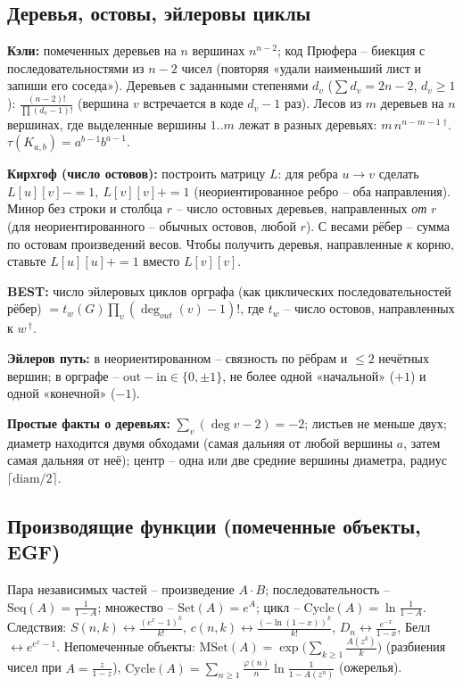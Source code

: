 \subsection{Деревья, остовы, эйлеровы циклы}
\textbf{Кэли:} помеченных деревьев на $n$ вершинах $n^{n-2}$; код Прюфера -- биекция с последовательностями из $n{-}2$ чисел (повторяя «удали наименьший лист и запиши его соседа»). Деревьев с заданными степенями $d_v$ ($\sum d_v=2n{-}2$, $d_v\ge1$): $\frac{(n-2)!}{\prod(d_v-1)!}$ (вершина $v$ встречается в коде $d_v{-}1$ раз). Лесов из $m$ деревьев на $n$ вершинах, где выделенные вершины $1..m$ лежат в разных деревьях: $m\,n^{n-m-1}$\,$^\dagger$. $\tau(K_{a,b})=a^{b-1}b^{a-1}$.
\par \textbf{Кирхгоф (число остовов):} построить матрицу $L$: для ребра $u\to v$ сделать $L[u][v]{-}{=}1,\ L[v][v]{+}{=}1$ (неориентированное ребро -- оба направления). Минор без строки и столбца $r$ -- число остовных деревьев, направленных \emph{от} $r$ (для неориентированного -- обычных остовов, любой $r$). С весами рёбер -- сумма по остовам произведений весов. Чтобы получить деревья, направленные \emph{к} корню, ставьте $L[u][u]{+}{=}1$ вместо $L[v][v]$.
\par \textbf{BEST:} число эйлеровых циклов орграфа (как циклических последовательностей рёбер) $=t_w(G)\prod_v(\deg_{out}(v){-}1)!$, где $t_w$ -- число остовов, направленных к $w$\,$^\dagger$.
\par \textbf{Эйлеров путь:} в неориентированном -- связность по рёбрам и $\le2$ нечётных вершин; в орграфе -- $\mathrm{out}-\mathrm{in}\in\{0,\pm1\}$, не более одной «начальной» ($+1$) и одной «конечной» ($-1$).
\par \textbf{Простые факты о деревьях:} $\sum_v(\deg v-2)=-2$; листьев не меньше двух; диаметр находится двумя обходами (самая дальняя от любой вершины $a$, затем самая дальняя от неё); центр -- одна или две средние вершины диаметра, радиус $\lceil\mathrm{diam}/2\rceil$.
\subsection{Производящие функции (помеченные объекты, EGF)}
Пара независимых частей -- произведение $A\cdot B$; последовательность -- $\mathrm{Seq}(A)=\frac1{1-A}$; множество -- $\mathrm{Set}(A)=e^{A}$; цикл -- $\mathrm{Cycle}(A)=\ln\frac1{1-A}$. Следствия: $S(n,k)\leftrightarrow\frac{(e^x-1)^k}{k!}$, $c(n,k)\leftrightarrow\frac{(-\ln(1-x))^k}{k!}$, $D_n\leftrightarrow\frac{e^{-x}}{1-x}$, Белл $\leftrightarrow e^{e^x-1}$. Непомеченные объекты: $\mathrm{MSet}(A)=\exp\big(\sum_{k\ge1}\frac{A(z^k)}k\big)$ (разбиения чисел при $A=\frac z{1-z}$), $\mathrm{Cycle}(A)=\sum_{n\ge1}\frac{\varphi(n)}n\ln\frac1{1-A(z^n)}$ (ожерелья).
